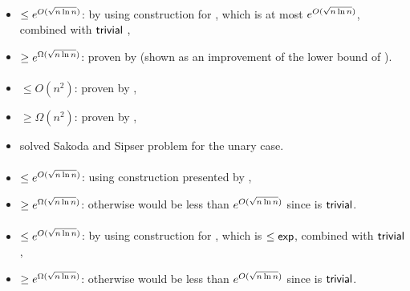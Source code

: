 \paragraph{\TDFA{}\tto\ONFA}\label{cost:2DFAto1NFAu}
\begin{itemize}
	\item $\le e^{O(\sqrt{n\ln n})}$: by using construction for \hyperref[cost:2DFAto1DFAu]{\TDFA{}\tto\ODFA}, which is at most $e^{O(\sqrt{n\ln n})}$, combined with $\mathsf{trivial}$ \ODFA{}\tto\ONFA,
	\item $\ge e^{\Omega(\sqrt{n\ln n})}$: proven by  (shown as an improvement of the lower bound of \hyperref[cost:2DFAto1DFAu]{\TDFA{}\tto\ODFA}).
\end{itemize}
\paragraph{\ONFA{}\tto\TDFA}\label{cost:1NFAto2DFAu}
\begin{itemize}
	\item $\le O(n^2)$: proven by ,
	\item $\ge \Omega(n^2)$: proven by ,
	\item solved Sakoda and Sipser problem for the unary case.
\end{itemize}
\paragraph{\TNFA{}\tto\ODFA}\label{cost:2NFAto1DFAu}
\begin{itemize}
	\item $\le e^{O(\sqrt{n\ln n})}$: using construction presented by ,
	\item $\ge e^{\Omega(\sqrt{n\ln n})}$: otherwise \hyperref[cost:2DFAto1DFAu]{\TDFA{}\tto\ODFA} would be less than $e^{O(\sqrt{n\ln n})}$ since \TDFA{}\tto\TNFA is $\mathsf{trivial}$.
\end{itemize}
\paragraph{\TNFA{}\tto\ONFA}
\begin{itemize}
	\item $\le e^{O(\sqrt{n\ln n})}$: by using construction for \hyperref[cost:2NFAto1DFAu]{\TNFA{}\tto\ODFA}, which is $\le\mathsf{exp}$, combined with $\mathsf{trivial}$ \ODFA{}\tto\ONFA,
	\item $\ge e^{\Omega(\sqrt{n\ln n})}$: otherwise \hyperref[cost:2DFAto1NFAu]{\TDFA{}\tto\ONFA} would be less than $e^{O(\sqrt{n\ln n})}$ since \TDFA{}\tto\TNFA is $\mathsf{trivial}$.
\end{itemize}
